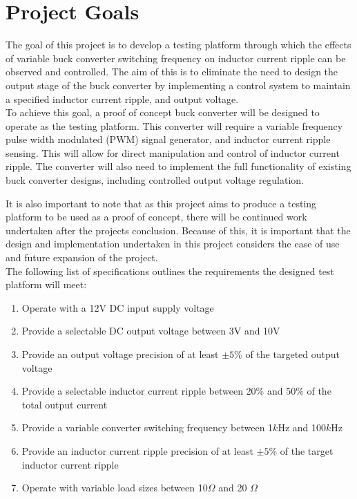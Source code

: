 \section{Project Goals}\label{S:goals}

The goal of this project is to develop a testing platform through which the effects of variable buck converter switching frequency on inductor current ripple can be observed and controlled. The aim of this is to eliminate the need to design the output stage of the buck converter by implementing a control system to maintain a specified inductor current ripple, and output voltage.\\

To achieve this goal, a proof of concept buck converter will be designed to operate as the testing platform. This converter will require a variable frequency pulse width modulated (PWM) signal generator, and inductor current ripple sensing. This will allow for direct manipulation and control of inductor current ripple. The converter will also need to implement the full functionality of existing buck converter designs, including controlled output voltage regulation.

It is also important to note that as this project aims to produce a testing platform to be used as a proof of concept, there will be continued work undertaken after the projects conclusion. Because of this, it is important that the design and implementation undertaken in this project considers the ease of use and future expansion of the project.\\

The following list of specifications outlines the requirements the designed test platform will meet:

\begin{enumerate}
    \item Operate with a 12V DC input supply voltage
    \item Provide a selectable DC output voltage between 3V and 10V
    \item Provide an output voltage precision of at least $\pm5\%$ of the targeted output voltage
    \item Provide a selectable inductor current ripple between 20\% and 50\% of the total output current
    \item Provide a variable converter switching frequency between 1$k$Hz and 100$k$Hz
    \item Provide an inductor current ripple precision of at least $\pm5$\% of the target inductor current ripple 
    \item Operate with variable load sizes between 10$\Omega$ and 20 $\Omega$
\end{enumerate}


